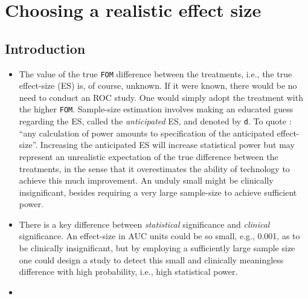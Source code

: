 \documentclass[]{book}
\begin{document}
\hypertarget{SSJafrocEffectSize}{%
\chapter{Choosing a realistic effect size}\label{SSJafrocEffectSize}}

\hypertarget{introduction-10}{%
\section{Introduction}\label{introduction-10}}

\begin{itemize}
\item
  The value of the true \texttt{FOM} difference between the treatments, i.e., the true effect-size (ES) is, of course, unknown. If it were known, there would be no need to conduct an ROC study. One would simply adopt the treatment with the higher \texttt{FOM}. Sample-size estimation involves making an educated guess regarding the ES, called the \emph{anticipated} ES, and denoted by \texttt{d}. To quote \citep{RN1983}: ``any calculation of power amounts to specification of the anticipated effect-size''. Increasing the anticipated ES will increase statistical power but may represent an unrealistic expectation of the true difference between the treatments, in the sense that it overestimates the ability of technology to achieve this much improvement. An unduly small might be clinically insignificant, besides requiring a very large sample-size to achieve sufficient power.
\item
  There is a key difference between \emph{statistical} significance and \emph{clinical} significance. An effect-size in AUC units could be so small, e.g., 0.001, as to be clinically insignificant, but by employing a sufficiently large sample size one could design a study to detect this small and clinically meaningless difference with high probability, i.e., high statistical power.
\item

\end{itemize}
\end{document}
